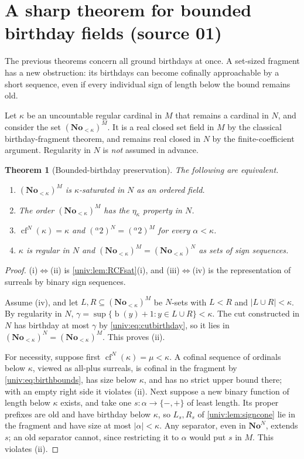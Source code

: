 \documentclass[11pt,letterpaper]{article}
\numberwithin{equation}{section}
\newtheorem{theorem}{Theorem}[section]
\theoremstyle{definition}
\theoremstyle{remark}
\newcommand{\No}{\mathbf{No}}
\newcommand{\NoN}{\No^{N}}
\newcommand{\bd}{\operatorname{b}}
\newcommand{\cf}{\operatorname{cf}}
\newcommand{\abs}[1]{\lvert#1\rvert}
\begin{document}
\section{A sharp theorem for bounded birthday fields (source 01)}\label{univ:sec:fragments}

The previous theorems concern all ground birthdays at once. A set-sized
fragment has a new obstruction: its birthdays can become cofinally approachable
by a short sequence, even if every individual sign of length below the bound
remains old.

Let $\kappa$ be an uncountable regular cardinal in $M$ that remains a cardinal
in $N$, and consider the set $(\No_{<\kappa})^M$. It is a real closed set field
in $M$ by the classical birthday-fragment theorem, and remains real closed in
$N$ by the finite-coefficient argument. Regularity in $N$ is \emph{not}
assumed in advance.

\begin{theorem}[Bounded-birthday preservation]\label{univ:thm:fragments}
The following are equivalent.
\begin{enumerate}[label=\textnormal{(\roman*)}]
\item $(\No_{<\kappa})^M$ is $\kappa$-saturated in $N$ as an ordered field.
\item The order $(\No_{<\kappa})^M$ has the $\eta_\kappa$ property in $N$.
\item $\cf^N(\kappa)=\kappa$ and $({}^\alpha2)^N=({}^\alpha2)^M$ for every
$\alpha<\kappa$.
\item $\kappa$ is regular in $N$ and $(\No_{<\kappa})^M=(\No_{<\kappa})^N$ as
sets of sign sequences.
\end{enumerate}
\end{theorem}
\begin{proof}
(i)$\Leftrightarrow$(ii) is \cref{univ:lem:RCFsat}(i), and
(iii)$\Leftrightarrow$(iv) is the representation of surreals by binary sign
sequences.

Assume (iv), and let $L,R\subseteq(\No_{<\kappa})^M$ be $N$-sets with $L<R$ and
$\abs{L\cup R}<\kappa$. By regularity in $N$,
$\gamma=\sup\{\bd(y)+1:y\in L\cup R\}<\kappa$. The cut constructed in $N$ has
birthday at most $\gamma$ by \eqref{univ:eq:cutbirthday}, so it lies in
$(\No_{<\kappa})^N=(\No_{<\kappa})^M$. This proves (ii).

For necessity, suppose first $\cf^N(\kappa)=\mu<\kappa$. A cofinal sequence of
ordinals below $\kappa$, viewed as all-plus surreals, is cofinal in the
fragment by \eqref{univ:eq:birthbounds}, has size below $\kappa$, and has no
strict upper bound there; with an empty right side it violates (ii). Next
suppose a new binary function of length below $\kappa$ exists, and take one
$s:\alpha\to\{-,+\}$ of least length. Its proper prefixes are old and have
birthday below $\kappa$, so $L_s,R_s$ of \cref{univ:lem:signcone} lie in the
fragment and have size at most $\abs\alpha<\kappa$. Any separator, even in
$\NoN$, extends $s$; an old separator cannot, since restricting it to $\alpha$
would put $s$ in $M$. This violates (ii).
\end{proof}
\end{document}

